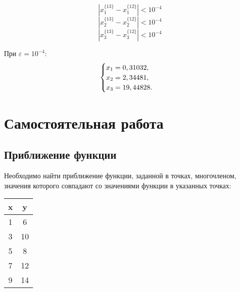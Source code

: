 \documentclass[10pt, a4paper, titlepage]{article}
\begin{document}
$$|x_1^{\{13\}}-x_1^{\{12\}}|<10^{-4}$$
$$|x_2^{\{13\}}-x_2^{\{12\}}|<10^{-4}$$
$$|x_3^{\{13\}}-x_3^{\{12\}}|<10^{-4}$$

При $\varepsilon=10^{-4}$:
\begin{equation*}
    \begin{cases}
        $$x_1=0,31032$$, \\
        $$x_2=2,34481$$, \\
        $$x_3=19,44828$$.
    \end{cases}
\end{equation*}

\section{Самостоятельная работа }

\subsection*{Приближение функции}

Необходимо найти приближение функции, заданной в точках, многочленом, значения которого совпадают со значениями функции в указанных точках:

\begin{center}
    \begin{tabular}{c|c}
        x & y \\ \hline
        1 & 6 \\
        3 & 10 \\
        5 & 8 \\
        7 & 12 \\
        9 & 14
    \end{tabular}
\end{center}
\end{document}
